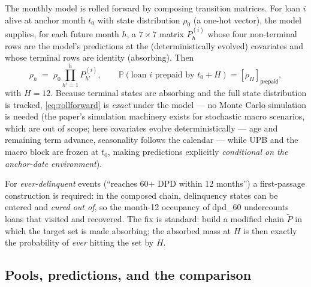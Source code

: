 \documentclass[11pt,a4paper]{article}
\newcommand{\Prob}{\mathbb{P}}
\newcommand{\state}[1]{\textsf{#1}}
\begin{document}
The monthly model is rolled forward by composing transition matrices. For loan $i$ alive at anchor month $t_0$ with state distribution $\rho_0$ (a one-hot vector), the model supplies, for each future month $h$, a $7\times 7$ matrix $P^{(i)}_h$ whose four non-terminal rows are the model's predictions at the (deterministically evolved) covariates and whose terminal rows are identity (absorbing). Then
\begin{equation}
\label{eq:rollforward}
\rho_h \;=\; \rho_0 \prod_{h'=1}^{h} P^{(i)}_{h'},
\qquad
\Prob\!\left(\text{loan } i \text{ prepaid by } t_0{+}H\right) = \left[\rho_H\right]_{\state{prepaid}},
\end{equation}
with $H=12$. Because terminal states are absorbing and the full state distribution is tracked, \eqref{eq:rollforward} is \emph{exact} under the model --- no Monte Carlo simulation is needed (the paper's simulation machinery exists for stochastic macro scenarios, which are out of scope; here covariates evolve deterministically --- age and remaining term advance, seasonality follows the calendar --- while UPB and the macro block are frozen at $t_0$, making predictions explicitly \emph{conditional on the anchor-date environment}).

For \emph{ever-delinquent} events (``reaches 60+ DPD within 12 months'') a first-passage construction is required: in the composed chain, delinquency states can be entered and \emph{cured out of}, so the month-12 occupancy of \state{dpd\_60} undercounts loans that visited and recovered. The fix is standard: build a modified chain $\widetilde P$ in which the target set is made absorbing; the absorbed mass at $H$ is then exactly the probability of \emph{ever} hitting the set by $H$.

\subsection{Pools, predictions, and the comparison}
\end{document}
